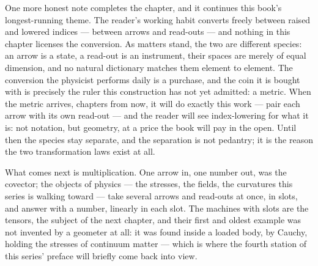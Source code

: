 One more honest note completes the chapter, and it continues this book's
longest-running theme. The reader's working habit converts freely between
raised and lowered indices --- between arrows and read-outs --- and nothing
in this chapter licenses the conversion. As matters stand, the two are
different species: an arrow is a state, a read-out is an instrument, their
spaces are merely of equal dimension, and no natural dictionary matches
them element to element. The conversion the physicist performs daily is a
purchase, and the coin it is bought with is precisely the ruler this
construction has not yet admitted: a metric. When the metric arrives,
chapters from now, it will do exactly this work --- pair each arrow with
its own read-out --- and the reader will see index-lowering for what it is:
not notation, but geometry, at a price the book will pay in the open. Until
then the species stay separate, and the separation is not pedantry; it is
the reason the two transformation laws exist at all.

What comes next is multiplication. One arrow in, one number out, was the
covector; the objects of physics --- the stresses, the fields, the
curvatures this series is walking toward --- take several arrows and
read-outs at once, in slots, and answer with a number, linearly in each
slot. The machines with slots are the tensors, the subject of the next
chapter, and their first and oldest example was not invented by a geometer
at all: it was found inside a loaded body, by Cauchy, holding the stresses
of continuum matter --- which is where the fourth station of this series'
preface will briefly come back into view.
